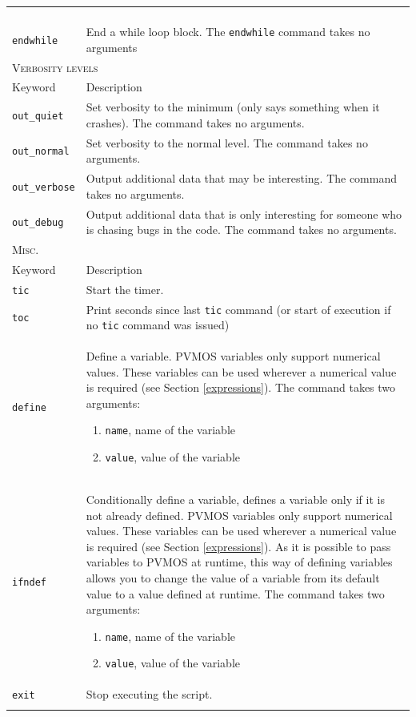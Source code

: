 \documentclass[noshowpacs,preprintnumbers,amsmath,amssymb, letter]{revtex4}
\begin{document}
\begin{longtable}{p{}p{}}
\begin{enumerate}
\end{enumerate}\\
\texttt{endwhile}	&  End a while loop block. The \texttt{endwhile} command takes no arguments\\
\multicolumn{2}{l}{\textsc{Verbosity levels}} \\*
\hline
Keyword & Description \\
\texttt{out\_quiet}	&  Set verbosity to the minimum (only says something when it crashes). The command takes no arguments.\\
\texttt{out\_normal}	&  Set verbosity to the normal level. The command takes no arguments.\\
\texttt{out\_verbose}	&  Output additional data that may be interesting. The command takes no arguments.\\
\texttt{out\_debug}	&  Output additional data that is only interesting for someone who is chasing bugs in the code. The command takes no arguments.\\
\multicolumn{2}{l}{\textsc{Misc.}} \\*
\hline
Keyword & Description \\
\texttt{tic}	&  Start the timer.\\
\texttt{toc}	&  Print seconds since last \texttt{tic} command (or start of execution if no \texttt{tic} command was issued)\\
\texttt{define}	&  Define a variable. PVMOS variables only support numerical values. These variables can be used wherever a numerical value is required (see Section \ref{expressions}). The command takes two arguments:
\begin{enumerate}
\item \texttt{name}, name of the variable
\item \texttt{value}, value of the variable
\end{enumerate}\\
\texttt{ifndef}	&  Conditionally define a variable, defines a variable only if it is not already defined. PVMOS variables only support numerical values. These variables can be used wherever a numerical value is required (see Section \ref{expressions}). As it is possible to pass variables to PVMOS at runtime, this way of defining variables allows you to change the value of a variable from its default value to a value defined at runtime. The command takes two arguments:
\begin{enumerate}
\item \texttt{name}, name of the variable
\item \texttt{value}, value of the variable
\end{enumerate}\\
\texttt{exit}	&  Stop executing the script.\\
\hline
\\
\end{longtable}
\end{document}
